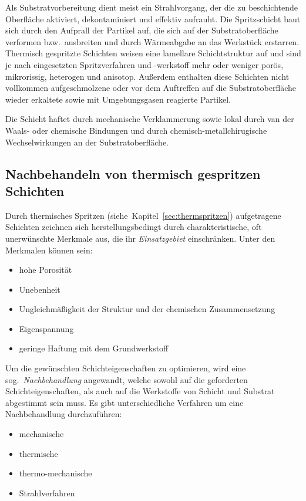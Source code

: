 \documentclass[12pt,a4paper,bibliography=totocnumbered,listof=totocnumbered,fleqn]{scrartcl}
\begin{document}
Als Substratvorbereitung dient meist ein Strahlvorgang, der die zu beschichtende Oberfläche aktiviert, dekontaminiert und effektiv aufrauht.
Die Spritzschicht baut sich durch den Aufprall der Partikel auf, die sich auf der Substratoberfläche verformen bzw.\ ausbreiten und durch Wärmeabgabe an das Werkstück erstarren.
Thermisch gespritzte Schichten weisen eine lamellare Schichtstruktur auf und sind je nach eingesetzten Spritzverfahren und -werkstoff mehr oder weniger porös, mikrorissig, heterogen und anisotop.
Außerdem enthalten diese Schichten nicht vollkommen aufgeschmolzene oder vor dem Auftreffen auf die Substratoberfläche wieder erkaltete sowie mit Umgebungsgasen reagierte Partikel.

Die Schicht haftet durch mechanische Verklammerung sowie lokal durch van der Waals- oder chemische Bindungen und durch chemisch-metallchirugische Wechselwirkungen an der Substratoberfläche.

\subsection{Nachbehandeln von thermisch gespritzen Schichten}

Durch thermisches Spritzen (siehe~Kapitel~\ref{sec:thermspritzen}) aufgetragene Schichten zeichnen sich herstellungsbedingt durch charakteristische, oft unerwünschte Merkmale aus, die ihr \emph{Einsatzgebiet} einschränken. Unter den Merkmalen können sein:

\begin{itemize}
	\item hohe Porosität
	\item Unebenheit
	\item Ungleichmäßigkeit der Struktur und der chemischen Zusammensetzung
	\item Eigenspannung
	\item geringe Haftung mit dem Grundwerkstoff
\end{itemize}

Um die gewünschten Schichteigenschaften zu optimieren, wird eine sog.\ \emph{Nachbehandlung} angewandt, welche sowohl auf die geforderten Schichteigenschaften, als auch auf die Werkstoffe von Schicht und Substrat abgestimmt sein muss. Es gibt unterschiedliche Verfahren um eine Nachbehandlung durchzuführen:

\begin{itemize}
	\item mechanische
	\item thermische
	\item thermo-mechanische
	\item Strahlverfahren
\end{itemize}
\end{document}
